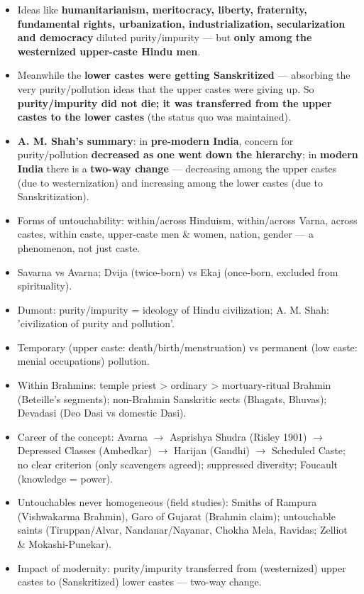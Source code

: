 \begin{KeyConcept}
\begin{itemize}
\item Ideas like \textbf{humanitarianism, meritocracy, liberty, fraternity, fundamental rights, urbanization, industrialization, secularization and democracy} diluted purity/impurity --- but \textbf{only among the westernized upper-caste Hindu men}.
\item Meanwhile the \textbf{lower castes were getting Sanskritized} --- absorbing the very purity/pollution ideas that the upper castes were giving up. So \textbf{purity/impurity did not die; it was transferred from the upper castes to the lower castes} (the status quo was maintained).
\item \textbf{A. M. Shah's summary}: in \textbf{pre-modern India}, concern for purity/pollution \textbf{decreased as one went down the hierarchy}; in \textbf{modern India} there is a \textbf{two-way change} --- decreasing among the upper castes (due to westernization) and increasing among the lower castes (due to Sanskritization).
\end{itemize}
\end{KeyConcept}

\begin{QuickRevision}
\begin{itemize}
\item Forms of untouchability: within/across Hinduism, within/across Varna, across castes, within caste, upper-caste men \& women, nation, gender --- a phenomenon, not just caste.
\item Savarna vs Avarna; Dvija (twice-born) vs Ekaj (once-born, excluded from spirituality).
\item Dumont: purity/impurity = ideology of Hindu civilization; A. M. Shah: 'civilization of purity and pollution'.
\item Temporary (upper caste: death/birth/menstruation) vs permanent (low caste: menial occupations) pollution.
\item Within Brahmins: temple priest > ordinary > mortuary-ritual Brahmin (Beteille's segments); non-Brahmin Sanskritic sects (Bhagats, Bhuvas); Devadasi (Deo Dasi vs domestic Dasi).
\item Career of the concept: Avarna $\rightarrow$ Asprishya Shudra (Risley 1901) $\rightarrow$ Depressed Classes (Ambedkar) $\rightarrow$ Harijan (Gandhi) $\rightarrow$ Scheduled Caste; no clear criterion (only scavengers agreed); suppressed diversity; Foucault (knowledge = power).
\item Untouchables never homogeneous (field studies): Smiths of Rampura (Vishwakarma Brahmin), Garo of Gujarat (Brahmin claim); untouchable saints (Tiruppan/Alvar, Nandanar/Nayanar, Chokha Mela, Ravidas; Zelliot \& Mokashi-Punekar).
\item Impact of modernity: purity/impurity transferred from (westernized) upper castes to (Sanskritized) lower castes --- two-way change.
\end{itemize}
\end{QuickRevision}

